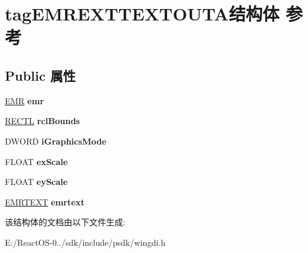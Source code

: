 \hypertarget{structtag_e_m_r_e_x_t_t_e_x_t_o_u_t_a}{}\section{tag\+E\+M\+R\+E\+X\+T\+T\+E\+X\+T\+O\+U\+T\+A结构体 参考}
\label{structtag_e_m_r_e_x_t_t_e_x_t_o_u_t_a}
\subsection*{Public 属性}
\begin{DoxyCompactItemize}
\item 
\mbox{\label{structtag_e_m_r_e_x_t_t_e_x_t_o_u_t_a_a4d2076f1ecc7074e7ff32ed72e8ab09e}} 
\hyperlink{structtag_e_m_r}{E\+MR} {\bfseries emr}
\item 
\mbox{\label{structtag_e_m_r_e_x_t_t_e_x_t_o_u_t_a_a86cc694901301c61d4011a9916232073}} 
\hyperlink{struct___r_e_c_t_l}{R\+E\+C\+TL} {\bfseries rcl\+Bounds}
\item 
\mbox{\label{structtag_e_m_r_e_x_t_t_e_x_t_o_u_t_a_a0e994ebe8d7f9d11a479a9322736232f}} 
D\+W\+O\+RD {\bfseries i\+Graphics\+Mode}
\item 
\mbox{\label{structtag_e_m_r_e_x_t_t_e_x_t_o_u_t_a_ad3e475a3da19c6e2ab6c7af2d8850387}} 
F\+L\+O\+AT {\bfseries ex\+Scale}
\item 
\mbox{\label{structtag_e_m_r_e_x_t_t_e_x_t_o_u_t_a_ac3082108fe66757b231d6164a7ef975c}} 
F\+L\+O\+AT {\bfseries ey\+Scale}
\item 
\mbox{\label{structtag_e_m_r_e_x_t_t_e_x_t_o_u_t_a_a0f18a9fb4a038f303374dcacb8964e43}} 
\hyperlink{structtag_e_m_r_t_e_x_t}{E\+M\+R\+T\+E\+XT} {\bfseries emrtext}
\end{DoxyCompactItemize}


该结构体的文档由以下文件生成\+:\begin{DoxyCompactItemize}
\item 
E\+:/\+React\+O\+S-\/0../sdk/include/psdk/wingdi.\+h\end{DoxyCompactItemize}
